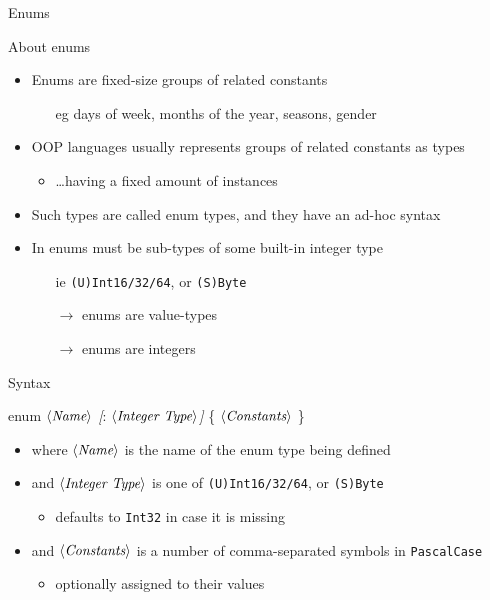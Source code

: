 \documentclass[presentation]{beamer}
\newcommand{\cscat}[1]{$\langle\text{{\itshape#1}}\rangle$}
\newcommand{\csopt}[1]{{\itshape[}#1{\itshape]}}
\begin{document}
\begin{frame}[allowframebreaks]{Enums}
  \begin{block}{About enums}
    \begin{itemize}
      \item Enums are fixed-size groups of related constants
      \begin{itemize}
        \item[eg] days of week, months of the year, seasons, gender  
      \end{itemize}

      \item OOP languages usually represents groups of related constants as types
      \begin{itemize}
        \item \ldots having a fixed amount of instances
      \end{itemize}

      \item Such types are called \alert{enum} types, and they have an ad-hoc syntax

      \item In \dotnet{} enums must be sub-types of some built-in integer type
      \begin{itemize}
        \item[ie] \texttt{(U)Int16/32/64}, or \texttt{(S)Byte}
        \item[$\rightarrow$] \dotnet enums are value-types
        \item[$\rightarrow$] \dotnet enums are integers 
      \end{itemize}
    \end{itemize}
  \end{block}

  \begin{block}{Syntax}
    \begin{center}\ttfamily
      enum \cscat{Name} \csopt{: \cscat{Integer Type}} \{ \cscat{Constants} \}
    \end{center}
    \begin{itemize}
      \item where \texttt{\cscat{Name}} is the name of the enum type being defined
      \item and \texttt{\cscat{Integer Type}} is one of \texttt{(U)Int16/32/64}, or \texttt{(S)Byte}
      \begin{itemize}
        \item defaults to \texttt{Int32} in case it is missing
      \end{itemize}
      \item and \cscat{Constants} is a number of comma-separated symbols in \texttt{PascalCase}
      \begin{itemize}
        \item optionally assigned to their values
      \end{itemize}
    \end{itemize}
  \end{block}


\end{frame}
\end{document}

